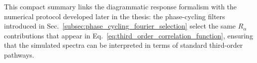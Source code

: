 \noindent
This compact summary links the diagrammatic response formalism with the numerical protocol developed later in the thesis: the phase-cycling filters introduced in Sec.~\ref{subsec:phase_cycling_fourier_selection} select the same $R_{\alpha}$ contributions that appear in Eq.~\eqref{eq:third_order_correlation_function}, ensuring that the simulated spectra can be interpreted in terms of standard third-order pathways.



